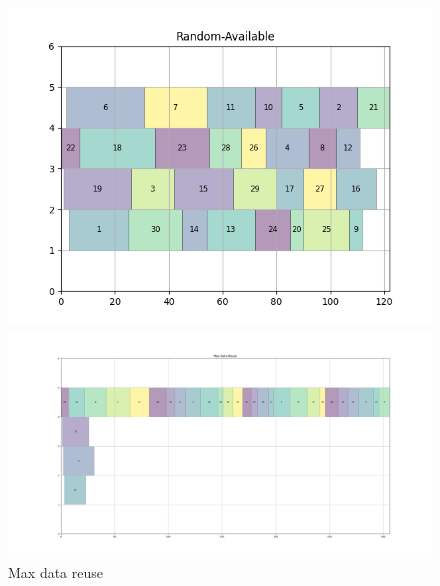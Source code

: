 \documentclass[a4paper]{article}
\begin{document}
\begin{figure}[ht]
  \begin{minipage}[b]{0.5\linewidth}
    \centering
    \includegraphics[width=1.11\linewidth]{MBSS/plot/Gantt_charts/Random-Available.png} 
    \caption{} 
    \vspace{4ex}
  \end{minipage}%
  \begin{minipage}[b]{0.5\linewidth}
    \centering
    \includegraphics[width=1.11\linewidth]{MBSS/plot/Gantt_charts/Max-Data-Reuse.png} 
    \caption{Max data reuse} 
    \vspace{4ex}
  \end{minipage}%
\end{figure}
\end{document}
